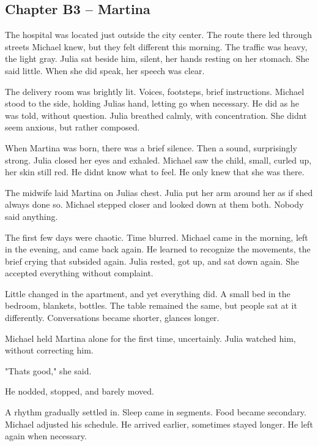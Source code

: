 \documentclass[
]{article}
\begin{document}
\subsection{Chapter B3 -- Martina}\label{chapter-b3-martina}

The hospital was located just outside the city center. The route there led through streets Michael knew, but they felt different this morning. The traffic was heavy, the light gray. Julia sat beside him, silent, her hands resting on her stomach. She said little. When she did speak, her speech was clear.

The delivery room was brightly lit. Voices, footsteps, brief instructions. Michael stood to the side, holding Julia\textquotesingle s hand, letting go when necessary. He did as he was told, without question. Julia breathed calmly, with concentration. She didn\textquotesingle t seem anxious, but rather composed.

When Martina was born, there was a brief silence. Then a sound, surprisingly strong. Julia closed her eyes and exhaled. Michael saw the child, small, curled up, her skin still red. He didn\textquotesingle t know what to feel. He only knew that she was there.

The midwife laid Martina on Julia\textquotesingle s chest. Julia put her arm around her as if she\textquotesingle d always done so. Michael stepped closer and looked down at them both. Nobody said anything.

The first few days were chaotic. Time blurred. Michael came in the morning, left in the evening, and came back again. He learned to recognize the movements, the brief crying that subsided again. Julia rested, got up, and sat down again. She accepted everything without complaint.

Little changed in the apartment, and yet everything did. A small bed in the bedroom, blankets, bottles. The table remained the same, but people sat at it differently. Conversations became shorter, glances longer.

Michael held Martina alone for the first time, uncertainly. Julia watched him, without correcting him.

"That\textquotesingle s good," she said.

He nodded, stopped, and barely moved.

A rhythm gradually settled in. Sleep came in segments. Food became secondary. Michael adjusted his schedule. He arrived earlier, sometimes stayed longer. He left again when necessary.
\end{document}
